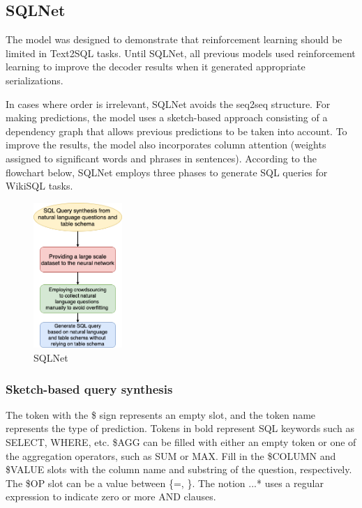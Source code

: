 \subsection{SQLNet}

The model was designed to demonstrate that reinforcement learning should be limited in Text2SQL tasks.
Until SQLNet\cite{xu_sqlnet_2017}, all previous models used reinforcement learning to improve the decoder results when it generated appropriate serializations.


In cases where order is irrelevant, SQLNet avoids the seq2seq structure.
For making predictions, the model uses a sketch-based approach consisting of a dependency graph that allows previous predictions to be taken into account.
To improve the results, the model also incorporates column attention (weights assigned to significant words and phrases in sentences). According to the flowchart below, SQLNet employs three phases to generate SQL queries for WikiSQL tasks.

\begin{figure}[htb]
    \centering
    \includegraphics[width=0.3\textwidth]{pics/sqlnet/sqlnet.png}
    \caption{SQLNet}
    \label{fig:sqlnet}
\end{figure}

\subsubsection*{Sketch-based query synthesis}

The token with the \$ sign represents an empty slot, and the token name represents the type of prediction. Tokens in bold represent SQL keywords such as SELECT, WHERE, etc.
\$AGG can be filled with either an empty token or one of the aggregation operators, such as SUM or MAX. Fill in the \$COLUMN and \$VALUE slots with the column name and substring of the question, respectively. The \$OP slot can be a value between \{=, \}. The notion \(...\)* uses a regular expression to indicate zero or more AND clauses.


